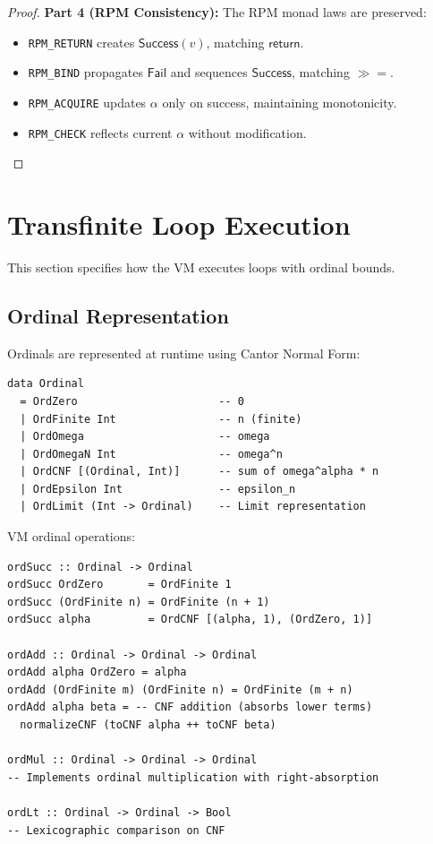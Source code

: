 \begin{proof}
\textbf{Part 4 (RPM Consistency):}
The RPM monad laws are preserved:
\begin{itemize}
  \item \texttt{RPM\_RETURN} creates $\mathsf{Success}(v)$, matching $\mathsf{return}$.
  \item \texttt{RPM\_BIND} propagates $\mathsf{Fail}$ and sequences $\mathsf{Success}$, matching $\gg\!=$.
  \item \texttt{RPM\_ACQUIRE} updates $\alpha$ only on success, maintaining monotonicity.
  \item \texttt{RPM\_CHECK} reflects current $\alpha$ without modification.
\end{itemize}
\end{proof}

\section{Transfinite Loop Execution}
\label{sec:transfinite-loop-vm}

This section specifies how the VM executes loops with ordinal bounds.

\subsection{Ordinal Representation}
\label{subsec:ordinal-representation}

\begin{definition}
\label{def:ordinal-repr}
Ordinals are represented at runtime using Cantor Normal Form:
\begin{verbatim}
data Ordinal
  = OrdZero                      -- 0
  | OrdFinite Int                -- n (finite)
  | OrdOmega                     -- omega
  | OrdOmegaN Int                -- omega^n
  | OrdCNF [(Ordinal, Int)]      -- sum of omega^alpha * n
  | OrdEpsilon Int               -- epsilon_n
  | OrdLimit (Int -> Ordinal)    -- Limit representation
\end{verbatim}
\end{definition}

\begin{definition}
\label{def:ordinal-arithmetic-vm}
VM ordinal operations:
\begin{verbatim}
ordSucc :: Ordinal -> Ordinal
ordSucc OrdZero       = OrdFinite 1
ordSucc (OrdFinite n) = OrdFinite (n + 1)
ordSucc alpha         = OrdCNF [(alpha, 1), (OrdZero, 1)]

ordAdd :: Ordinal -> Ordinal -> Ordinal
ordAdd alpha OrdZero = alpha
ordAdd (OrdFinite m) (OrdFinite n) = OrdFinite (m + n)
ordAdd alpha beta = -- CNF addition (absorbs lower terms)
  normalizeCNF (toCNF alpha ++ toCNF beta)

ordMul :: Ordinal -> Ordinal -> Ordinal
-- Implements ordinal multiplication with right-absorption

ordLt :: Ordinal -> Ordinal -> Bool
-- Lexicographic comparison on CNF
\end{verbatim}
\end{definition}

